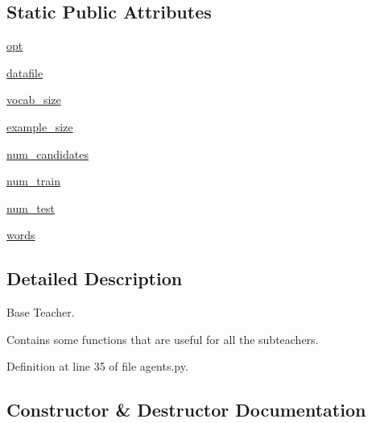 \subsection*{Static Public Attributes}
\begin{DoxyCompactItemize}
\item 
\hyperlink{classparlai_1_1tasks_1_1integration__tests_1_1agents_1_1CandidateBaseTeacher_a41dc4440360113264f1389783155e841}{opt}
\item 
\hyperlink{classparlai_1_1tasks_1_1integration__tests_1_1agents_1_1CandidateBaseTeacher_a23f437e60b62bb7e31cbf627b4c48c65}{datafile}
\item 
\hyperlink{classparlai_1_1tasks_1_1integration__tests_1_1agents_1_1CandidateBaseTeacher_a31217a9a5acf0998b93eb6158d75cab8}{vocab\+\_\+size}
\item 
\hyperlink{classparlai_1_1tasks_1_1integration__tests_1_1agents_1_1CandidateBaseTeacher_ad54fab6275ea263e73bad5eb18990a51}{example\+\_\+size}
\item 
\hyperlink{classparlai_1_1tasks_1_1integration__tests_1_1agents_1_1CandidateBaseTeacher_afc5bcbad709ce9ab26c3550dc49a9abc}{num\+\_\+candidates}
\item 
\hyperlink{classparlai_1_1tasks_1_1integration__tests_1_1agents_1_1CandidateBaseTeacher_a89e6a9e0e7b63a46dbc5f4405e98a877}{num\+\_\+train}
\item 
\hyperlink{classparlai_1_1tasks_1_1integration__tests_1_1agents_1_1CandidateBaseTeacher_aa3fa137864cf5e194240f00d3fe04801}{num\+\_\+test}
\item 
\hyperlink{classparlai_1_1tasks_1_1integration__tests_1_1agents_1_1CandidateBaseTeacher_adacce3fdb348bc21cb421acf25939a37}{words}
\end{DoxyCompactItemize}


\subsection{Detailed Description}
\begin{DoxyVerb}Base Teacher.

Contains some functions that are useful for all the subteachers.
\end{DoxyVerb}
 

Definition at line 35 of file agents.\+py.



\subsection{Constructor \& Destructor Documentation}
\mbox{\label{classparlai_1_1tasks_1_1integration__tests_1_1agents_1_1CandidateBaseTeacher_a0b4a597b51cf2901e3af2dc59c41f137}} 
